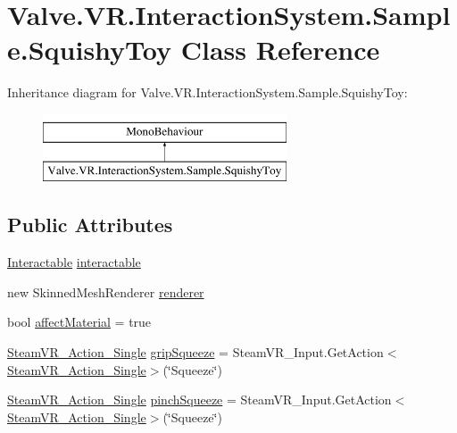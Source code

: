 \hypertarget{class_valve_1_1_v_r_1_1_interaction_system_1_1_sample_1_1_squishy_toy}{}\section{Valve.\+V\+R.\+Interaction\+System.\+Sample.\+Squishy\+Toy Class Reference}
\label{class_valve_1_1_v_r_1_1_interaction_system_1_1_sample_1_1_squishy_toy}
Inheritance diagram for Valve.\+V\+R.\+Interaction\+System.\+Sample.\+Squishy\+Toy\+:\begin{figure}[H]
\begin{center}
\leavevmode
\includegraphics[height=2.000000cm]{class_valve_1_1_v_r_1_1_interaction_system_1_1_sample_1_1_squishy_toy}
\end{center}
\end{figure}
\subsection*{Public Attributes}
\begin{DoxyCompactItemize}
\item 
\mbox{\hyperlink{class_valve_1_1_v_r_1_1_interaction_system_1_1_interactable}{Interactable}} \mbox{\hyperlink{class_valve_1_1_v_r_1_1_interaction_system_1_1_sample_1_1_squishy_toy_ab2adf011ad980c7fc7869f16d6ddd391}{interactable}}
\item 
new Skinned\+Mesh\+Renderer \mbox{\hyperlink{class_valve_1_1_v_r_1_1_interaction_system_1_1_sample_1_1_squishy_toy_a98aa284f24410c72459ac8a44f1366a7}{renderer}}
\item 
bool \mbox{\hyperlink{class_valve_1_1_v_r_1_1_interaction_system_1_1_sample_1_1_squishy_toy_a282e8574aef9d3c0959d98ef6ce09ad1}{affect\+Material}} = true
\item 
\mbox{\hyperlink{class_valve_1_1_v_r_1_1_steam_v_r___action___single}{Steam\+V\+R\+\_\+\+Action\+\_\+\+Single}} \mbox{\hyperlink{class_valve_1_1_v_r_1_1_interaction_system_1_1_sample_1_1_squishy_toy_a0d622661e59529ca14c7af7db96667a9}{grip\+Squeeze}} = Steam\+V\+R\+\_\+\+Input.\+Get\+Action$<$\mbox{\hyperlink{class_valve_1_1_v_r_1_1_steam_v_r___action___single}{Steam\+V\+R\+\_\+\+Action\+\_\+\+Single}}$>$(\char`\"{}Squeeze\char`\"{})
\item 
\mbox{\hyperlink{class_valve_1_1_v_r_1_1_steam_v_r___action___single}{Steam\+V\+R\+\_\+\+Action\+\_\+\+Single}} \mbox{\hyperlink{class_valve_1_1_v_r_1_1_interaction_system_1_1_sample_1_1_squishy_toy_a23f7d66f584278c6280f278041c6ae0b}{pinch\+Squeeze}} = Steam\+V\+R\+\_\+\+Input.\+Get\+Action$<$\mbox{\hyperlink{class_valve_1_1_v_r_1_1_steam_v_r___action___single}{Steam\+V\+R\+\_\+\+Action\+\_\+\+Single}}$>$(\char`\"{}Squeeze\char`\"{})
\end{DoxyCompactItemize}


